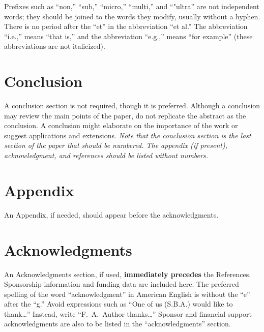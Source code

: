 \documentclass[conf]{new-aiaa}
\begin{document}
Prefixes such as ``non,'' ``sub,'' ``micro,'' ``multi,'' and ``"ultra'' are not independent words; they should be joined to the words they modify, usually without a hyphen. There is no period after the ``et'' in the abbreviation ``et al.'' The abbreviation ``i.e.,'' means ``that is,'' and the abbreviation ``e.g.,'' means ``for example'' (these abbreviations are not italicized).


\section{Conclusion}
A conclusion section is not required, though it is preferred. Although a conclusion may review the main points of the paper, do not replicate the abstract as the conclusion. A conclusion might elaborate on the importance of the work or suggest applications and extensions. \textit{Note that the conclusion section is the last section of the paper that should be numbered. The appendix (if present), acknowledgment, and references should be listed without numbers.}


\section*{Appendix}

An Appendix, if needed, should appear before the acknowledgments.

\section*{Acknowledgments}
An Acknowledgments section, if used, \textbf{immediately precedes} the References. Sponsorship information and funding data are included here. The preferred spelling of the word ``acknowledgment'' in American English is without the ``e'' after the ``g.'' Avoid expressions such as ``One of us (S.B.A.) would like to thank\ldots'' Instead, write ``F.~A.~Author thanks\ldots'' Sponsor and financial support acknowledgments are also to be listed in the ``acknowledgments'' section.



\end{document}
